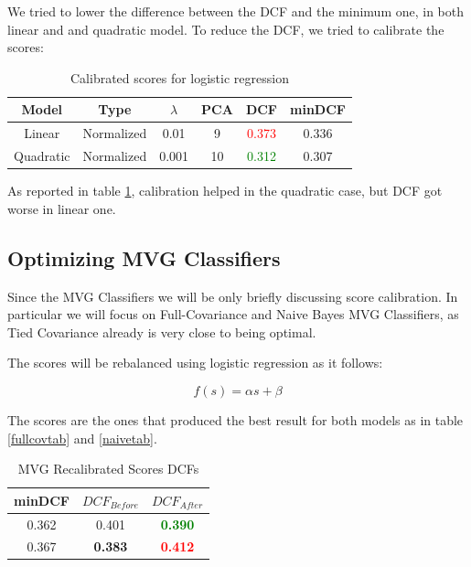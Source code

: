 \documentclass[12pt, twocolumn]{article}
\begin{document}
We tried to lower the difference between the DCF and the minimum one, in both linear and and quadratic model.
To reduce the DCF, we tried to calibrate the scores:

\begin{table}[H]
    \tiny
    \centering
        \begin{tabular}{||c|c|c|c|c|c||}
            \hline
            Model & Type & $\lambda$ & PCA & DCF & minDCF \\
            \hline
            \hline
            Linear & Normalized & 0.01 & 9 & \textcolor{red}{0.373} &  0.336  \\
            Quadratic & Normalized & 0.001 & 10 & \textcolor{green}{0.312} &  0.307  \\
            \hline
    \end{tabular}
    \caption{Calibrated scores for logistic regression}
    \label{logregcalibration}
\end{table}

As reported in table \ref{logregcalibration}, calibration helped in the quadratic case, 
but DCF got worse in linear one.

\subsection{Optimizing MVG Classifiers}

Since the MVG Classifiers we will be only briefly discussing score calibration.
In particular we will focus on Full-Covariance and Naive Bayes MVG Classifiers, as Tied Covariance already is very close to being optimal.

The scores will be rebalanced using logistic regression as it follows:


\begin{equation}
    f(s) = \alpha s + \beta
\end{equation}

The scores are the ones that produced the best result for both models as in table \ref{fullcovtab} and \ref{naivetab}. 

\begin{table}[H]
    \centering
        \begin{tabular}{||c|c|c||}
            \hline
            minDCF & $DCF_{Before}$ & $DCF_{After}$ \\
            \hline
            \hline
            0.362 & 0.401 & \textcolor{green}{\bf0.390} \\ 
            0.367 & {\bf 0.383} & \textcolor{red}{\bf 0.412} \\ 
            \hline
    \end{tabular}
    \caption{MVG Recalibrated Scores DCFs}
    \label{mvgcalibration}
\end{table}
\end{document}
